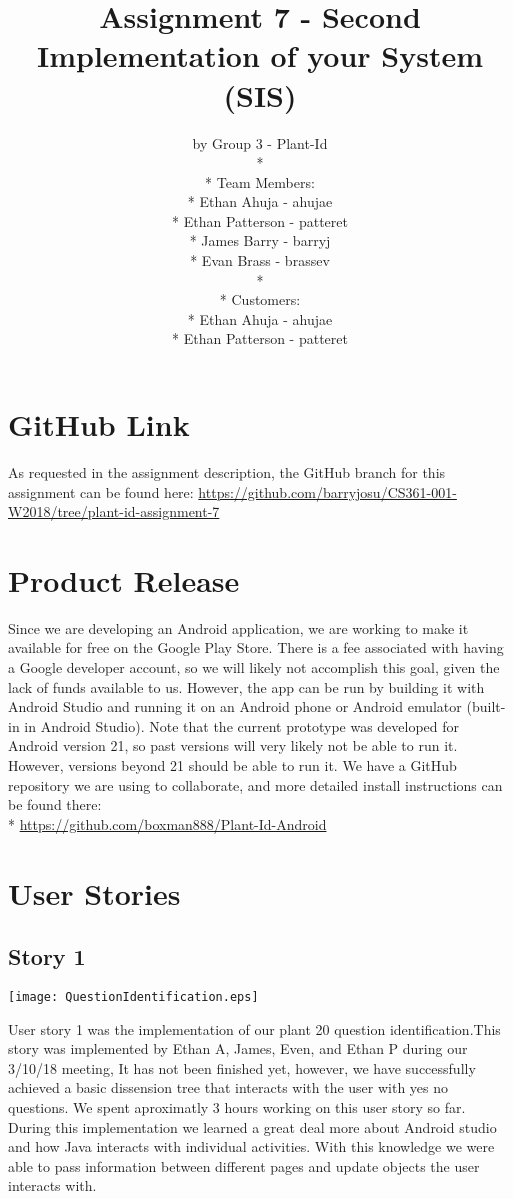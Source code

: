 \documentclass[a4paper]{article}
\title{Assignment 7 - Second Implementation of your System (SIS)}
\author{ by Group 3 - Plant-Id \\* \\* Team Members: \\* Ethan Ahuja - ahujae \\* Ethan Patterson - patteret \\* James Barry - barryj \\* Evan Brass - brassev \\* \\* Customers: \\* Ethan Ahuja - ahujae \\* Ethan Patterson - patteret}
\begin{document}
\maketitle
\pagebreak
\tableofcontents
\pagebreak
\section{GitHub Link}
As requested in the assignment description, the GitHub branch for this assignment can be found here: \url{https://github.com/barryjosu/CS361-001-W2018/tree/plant-id-assignment-7}

\section{Product Release}
Since we are developing an Android application, we are working to make it available for free on the Google Play Store. There is a fee associated with having a Google developer account, so we will likely not accomplish this goal, given the lack of funds available to us. However, the app can be run by building it with Android Studio and running it on an Android phone or Android emulator (built-in in Android Studio). Note that the current prototype was developed for Android version 21, so past versions will very likely not be able to run it. However, versions beyond 21 should be able to run it. We have a GitHub repository we are using to collaborate, and more detailed install instructions can be found there: \\*
\url{https://github.com/boxman888/Plant-Id-Android}
\pagebreak
\section{User Stories}
\subsection{Story 1}
\begin{center}\texttt{[image: QuestionIdentification.eps]}\end{center}
User story 1 was the implementation of our plant 20 question identification.This story was implemented by Ethan A, James, Even, and Ethan P during our 3/10/18 meeting, It has not been finished yet, however, we have successfully achieved a basic dissension tree that interacts with the user with yes no questions. We spent aproximatly 3 hours working on this user story so far. During this implementation we learned a great deal more about Android studio and how Java interacts with individual activities. With this knowledge we were able to pass information between different pages and update objects the user interacts with.
\end{document}
